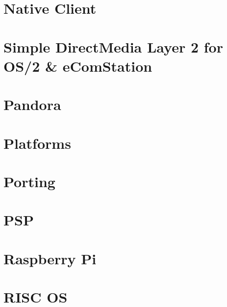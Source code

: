 \documentclass[twoside]{book}
\newcommand{\+}{\discretionary{\mbox{\scriptsize$\hookleftarrow$}}{}{}}
\begin{document}
\chapter{Native Client}
\label{md__d___ray_tracing_docs__r_e_a_d_m_e_nacl}

\chapter{Simple Direct\+Media Layer 2 for OS/2 \& e\+Com\+Station}
\label{md__d___ray_tracing_docs__r_e_a_d_m_e_os2}

\chapter{Pandora}
\label{md__d___ray_tracing_docs__r_e_a_d_m_e_pandora}

\chapter{Platforms}
\label{md__d___ray_tracing_docs__r_e_a_d_m_e_platforms}

\chapter{Porting}
\label{md__d___ray_tracing_docs__r_e_a_d_m_e_porting}

\chapter{PSP}
\label{md__d___ray_tracing_docs__r_e_a_d_m_e_psp}

\chapter{Raspberry Pi}
\label{md__d___ray_tracing_docs__r_e_a_d_m_e_raspberrypi}

\chapter{RISC OS}
\label{md__d___ray_tracing_docs__r_e_a_d_m_e_riscos}

\end{document}
